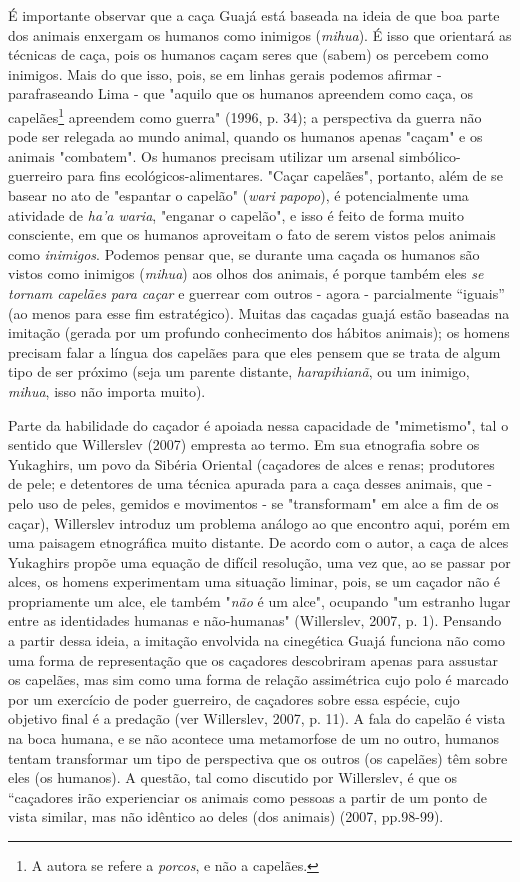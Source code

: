 É importante observar que a caça Guajá está baseada na ideia de que boa
parte dos animais enxergam os humanos como inimigos (\emph{mihua}). É
isso que orientará as técnicas de caça, pois os humanos caçam seres que
(sabem) os percebem como inimigos. Mais do que isso, pois, se em linhas
gerais podemos afirmar - parafraseando Lima - que "aquilo que os humanos
apreendem como caça, os capelães\footnote{A autora se refere a
  \emph{porcos}, e não a capelães.} apreendem como guerra" (1996, p.
34); a perspectiva da guerra não pode ser relegada ao mundo animal,
quando os humanos apenas "caçam" e os animais "combatem". Os humanos
precisam utilizar um arsenal simbólico-guerreiro para fins
ecológicos-alimentares. "Caçar capelães", portanto, além de se basear no
ato de "espantar o capelão" (\emph{wari} \emph{papopo}), é
potencialmente uma atividade de \emph{ha'a waria}, "enganar o capelão",
e isso é feito de forma muito consciente, em que os humanos aproveitam o
fato de serem vistos pelos animais como \emph{inimigos}. Podemos pensar
que, se durante uma caçada os humanos são vistos como inimigos
(\emph{mihua}) aos olhos dos animais, é porque também eles \emph{se
tornam capelães para caçar} e guerrear com outros - agora - parcialmente
``iguais'' (ao menos para esse fim estratégico). Muitas das caçadas
guajá estão baseadas na imitação (gerada por um profundo conhecimento
dos hábitos animais); os homens precisam falar a língua dos capelães
para que eles pensem que se trata de algum tipo de ser próximo (seja um
parente distante, \emph{harapihianã}, ou um inimigo, \emph{mihua}, isso
não importa muito).

Parte da habilidade do caçador é apoiada nessa capacidade de
"mimetismo", tal o sentido que Willerslev (2007) empresta ao termo. Em
sua etnografia sobre os Yukaghirs, um povo da Sibéria Oriental
(caçadores de alces e renas; produtores de pele; e detentores de uma
técnica apurada para a caça desses animais, que - pelo uso de peles,
gemidos e movimentos - se "transformam" em alce a fim de os caçar),
Willerslev introduz um problema análogo ao que encontro aqui, porém em
uma paisagem etnográfica muito distante. De acordo com o autor, a caça
de alces Yukaghirs propõe uma equação de difícil resolução, uma vez que,
ao se passar por alces, os homens experimentam uma situação liminar,
pois, se um caçador não é propriamente um alce, ele também "\emph{não} é
um alce", ocupando "um estranho lugar entre as identidades humanas e
não-humanas" (Willerslev, 2007, p. 1). Pensando a partir dessa ideia, a
imitação envolvida na cinegética Guajá funciona não como uma forma de
representação que os caçadores descobriram apenas para assustar os
capelães, mas sim como uma forma de relação assimétrica cujo polo é
marcado por um exercício de poder guerreiro, de caçadores sobre essa
espécie, cujo objetivo final é a predação (ver Willerslev, 2007, p. 11).
A fala do capelão é vista na boca humana, e se não acontece uma
metamorfose de um no outro, humanos tentam transformar um tipo de
perspectiva que os outros (os capelães) têm sobre eles (os humanos). A
questão, tal como discutido por Willerslev, é que os ``caçadores irão
experienciar os animais como pessoas a partir de um ponto de vista
similar, mas não idêntico ao deles (dos animais) (2007, pp.98-99).

